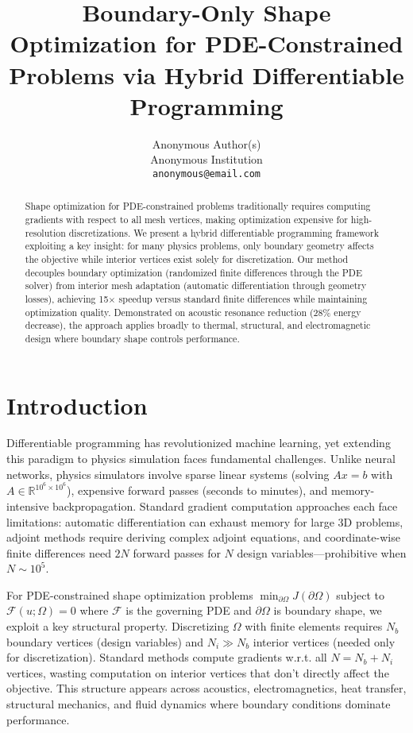 \documentclass{article}
\title{Boundary-Only Shape Optimization for PDE-Constrained Problems via Hybrid Differentiable Programming}
\author{%
  Anonymous Author(s) \\
  Anonymous Institution \\
  \texttt{anonymous@email.com}
}
\begin{document}
\maketitle

\begin{abstract}
Shape optimization for PDE-constrained problems traditionally requires computing gradients with respect to all mesh vertices, making optimization expensive for high-resolution discretizations. We present a hybrid differentiable programming framework exploiting a key insight: for many physics problems, only boundary geometry affects the objective while interior vertices exist solely for discretization. Our method decouples boundary optimization (randomized finite differences through the PDE solver) from interior mesh adaptation (automatic differentiation through geometry losses), achieving 15$\times$ speedup versus standard finite differences while maintaining optimization quality. Demonstrated on acoustic resonance reduction (28\% energy decrease), the approach applies broadly to thermal, structural, and electromagnetic design where boundary shape controls performance.
\end{abstract}

\section{Introduction}

Differentiable programming has revolutionized machine learning, yet extending this paradigm to physics simulation faces fundamental challenges. Unlike neural networks, physics simulators involve sparse linear systems (solving $Ax = b$ with $A \in \mathbb{R}^{10^6 \times 10^6}$), expensive forward passes (seconds to minutes), and memory-intensive backpropagation. Standard gradient computation approaches each face limitations: automatic differentiation can exhaust memory for large 3D problems, adjoint methods require deriving complex adjoint equations, and coordinate-wise finite differences need $2N$ forward passes for $N$ design variables—prohibitive when $N \sim 10^5$.

For PDE-constrained shape optimization problems $\min_{\partial\Omega} J(\partial\Omega)$ subject to $\mathcal{F}(u; \Omega) = 0$ where $\mathcal{F}$ is the governing PDE and $\partial\Omega$ is boundary shape, we exploit a key structural property. Discretizing $\Omega$ with finite elements requires $N_b$ boundary vertices (design variables) and $N_i \gg N_b$ interior vertices (needed only for discretization). Standard methods compute gradients w.r.t. all $N = N_b + N_i$ vertices, wasting computation on interior vertices that don't directly affect the objective. This structure appears across acoustics, electromagnetics, heat transfer, structural mechanics, and fluid dynamics where boundary conditions dominate performance.
\end{document}
